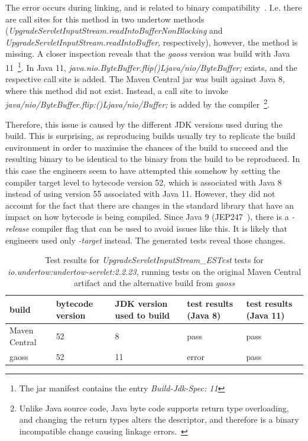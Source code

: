 \documentclass[conference]{IEEEtran}
\begin{document}
The error occurs during linking, and is related to binary compatibility~\cite{JVM17Spec}. I.e. there are call sites for this method in two undertow methods (\textit{UpgradeServletInputStream.readIntoBufferNonBlocking} and \textit{UpgradeServletInputStream.readIntoBuffer}, respectively), however, the method is missing. 
A closer inspection reveals that the \textit{gaoss} version was build with Java 11~\footnote{The jar manifest contains the entry \textit{Build-Jdk-Spec: 11}}. In Java 11, \textit{java.nio.ByteBuffer.flip()Ljava/nio/ByteBuffer;} exists, and the respective call site is added. The Maven Central jar was built against Java 8, where this method did not exist.  Instead, a call site to invoke \textit{java/nio/ByteBuffer.flip:()Ljava/nio/Buffer;} is added by the compiler~\footnote{Unlike Java source code, Java byte code supports return type overloading, and changing the return types alters the descriptor, and therefore is a binary incompatible change causing linkage errors.~\cite{JVM17Spec,dietrich2014broken}}.

Therefore, this issue is caused by the different JDK versions used during the build. This is surprising, as reproducing builds usually try to replicate the build environment in order to maximise the chances of the build to succeed and the resulting binary to be identical to the binary from the build to be reproduced. In this case the engineers seem to have attempted this somehow by setting the compiler target level to bytecode version 52, which is associated with Java 8~\cite[Sect. 4.1]{JVM17Spec} instead of using version 55 associated with Java 11.  However, they did not account for the fact that there are changes in the standard library that have an impact on how bytecode is being compiled. Since Java 9 (JEP247~\cite{jep247}), there is a \textit{-release} compiler  flag that can be used to avoid issues like this. It is likely that engineers used only \textit{-target} instead. The generated tests reveal those changes.  

\begin{table}[h]
	\begin{tabular}{|p{1.8cm}p{0.9cm}p{1.5cm}p{1.2cm}p{1.2cm}|}
		\hline
		build         & bytecode version & JDK version used to build & test results (Java 8)                                                    & test results (Java 11) \\ \hline 
		Maven Central & 52               & 8                         & pass                                                                     & pass                   \\
		gaoss         & 52               & 11                        & error & pass                  \\ \hline
	\end{tabular}
	\caption{Test results for \textit{UpgradeServletInputStream\_ESTest} tests for  \textit{io.undertow:undertow-servlet:2.2.23}, running tests on the original Maven Central artifact and the alternative build from \textit{gaoss}}
	\label{tab:nosuchmethoderror}
\end{table}
\end{document}
